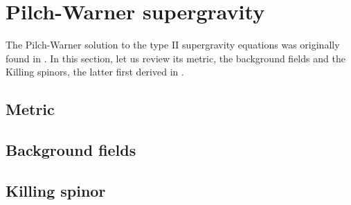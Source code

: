 \section{Pilch-Warner supergravity}\label{sec:PWB}
The Pilch-Warner solution to the type II supergravity equations was originally found in \cite{Pilch:2000ue}. 
In this section, let us review its metric, the background fields and the Killing spinors, the latter first derived in \cite{Pilch:2003jg}. 

\subsection{Metric}\label{sec:metric}


\subsection{Background fields}


\subsection{Killing spinor}\label{sec:KillingSpinor}








